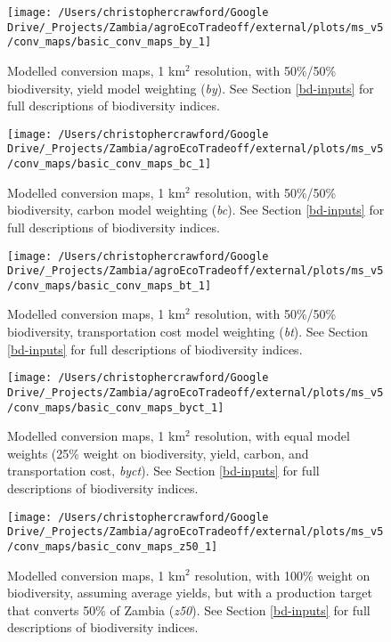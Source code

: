\documentclass[
]{article}
\begin{document}
\begin{figure}
\texttt{[image: /Users/christophercrawford/Google Drive/\_Projects/Zambia/agroEcoTradeoff/external/plots/ms\_v5/conv\_maps/basic\_conv\_maps\_by\_1]} \caption{Modelled conversion maps, 1 km\(^2\) resolution, with 50\%/50\% biodiversity, yield model weighting (\emph{by}). See Section \ref{bd-inputs} for full descriptions of biodiversity indices.}\label{fig:conv-maps-1-by}
\end{figure}

\begin{figure}
\texttt{[image: /Users/christophercrawford/Google Drive/\_Projects/Zambia/agroEcoTradeoff/external/plots/ms\_v5/conv\_maps/basic\_conv\_maps\_bc\_1]} \caption{Modelled conversion maps, 1 km\(^2\) resolution, with 50\%/50\% biodiversity, carbon model weighting (\emph{bc}). See Section \ref{bd-inputs} for full descriptions of biodiversity indices.}\label{fig:conv-maps-1-bc}
\end{figure}

\begin{figure}
\texttt{[image: /Users/christophercrawford/Google Drive/\_Projects/Zambia/agroEcoTradeoff/external/plots/ms\_v5/conv\_maps/basic\_conv\_maps\_bt\_1]} \caption{Modelled conversion maps, 1 km\(^2\) resolution, with 50\%/50\% biodiversity, transportation cost model weighting (\emph{bt}). See Section \ref{bd-inputs} for full descriptions of biodiversity indices.}\label{fig:conv-maps-1-bt}
\end{figure}

\begin{figure}
\texttt{[image: /Users/christophercrawford/Google Drive/\_Projects/Zambia/agroEcoTradeoff/external/plots/ms\_v5/conv\_maps/basic\_conv\_maps\_byct\_1]} \caption{Modelled conversion maps, 1 km\(^2\) resolution, with equal model weights (25\% weight on biodiversity, yield, carbon, and transportation cost, \emph{byct}). See Section \ref{bd-inputs} for full descriptions of biodiversity indices.}\label{fig:conv-maps-1-byct}
\end{figure}

\begin{figure}
\texttt{[image: /Users/christophercrawford/Google Drive/\_Projects/Zambia/agroEcoTradeoff/external/plots/ms\_v5/conv\_maps/basic\_conv\_maps\_z50\_1]} \caption{Modelled conversion maps, 1 km\(^2\) resolution, with 100\% weight on biodiversity, assuming average yields, but with a production target that converts 50\% of Zambia (\emph{z50}). See Section \ref{bd-inputs} for full descriptions of biodiversity indices.}\label{fig:conv-maps-1-z50}
\end{figure}
\end{document}
